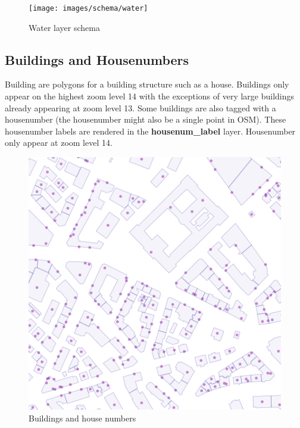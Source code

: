\begin{figure}[H]
  \centering
  \texttt{[image: images/schema/water]}
  \caption{Water layer schema}
\end{figure}

\subsection{Buildings and Housenumbers}

\noindent\begin{minipage}[t]{0.48\linewidth}
    \vspace{0pt}
    Building are polygons for a building structure such as a house. Buildings only appear on the highest zoom level 14 with the exceptions of very large buildings already appearing at zoom level 13.
    Some buildings are also tagged with a housenumber (the housenumber might also be a single point in OSM). These housenumber labels are rendered in the \textbf{housenum\_label} layer. Housenumber only appear at zoom level 14.
\end{minipage}
\hfill
\begin{minipage}[t]{0.48\linewidth}
    \vspace{-20pt}
    \begin{figure}[H]
      \includegraphics[width=1\textwidth]{images/schema/building_example}
      \caption{Buildings and house numbers}
    \end{figure}
\end{minipage}

